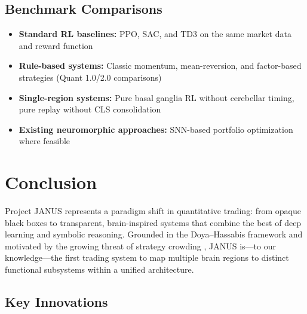 \documentclass[12pt, a4paper]{article}
\begin{document}
\subsection{Benchmark Comparisons}

\begin{itemize}
	\item \textbf{Standard RL baselines:} PPO, SAC, and TD3 on the same market data and reward function
	\item \textbf{Rule-based systems:} Classic momentum, mean-reversion, and factor-based strategies (Quant 1.0/2.0 comparisons)
	\item \textbf{Single-region systems:} Pure basal ganglia RL without cerebellar timing, pure replay without CLS consolidation
	\item \textbf{Existing neuromorphic approaches:} SNN-based portfolio optimization \citep{mohan2025snn_portfolio} where feasible
\end{itemize}

\section{Conclusion}
\label{sec:conclusion}

Project JANUS represents a paradigm shift in quantitative trading: from opaque black boxes to transparent, brain-inspired systems that combine the best of deep learning and symbolic reasoning. Grounded in the Doya--Hassabis framework \citep{doya1999computations, hassabis2017neuroscience} and motivated by the growing threat of strategy crowding \citep{bucci2020coimpact, khandani2011quants}, JANUS is---to our knowledge---the first trading system to map multiple brain regions to distinct functional subsystems within a unified architecture.

\subsection{Key Innovations}
\end{document}
